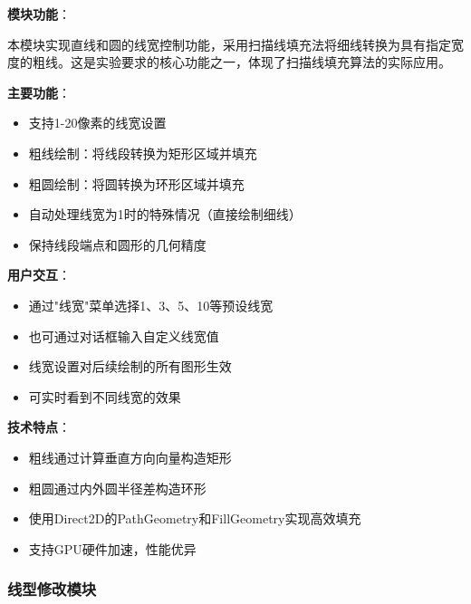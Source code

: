 \documentclass[12pt,a4paper]{article}
\begin{document}
\begin{tcolorbox}
\textbf{模块功能}：

本模块实现直线和圆的线宽控制功能，采用扫描线填充法将细线转换为具有指定宽度的粗线。这是实验要求的核心功能之一，体现了扫描线填充算法的实际应用。

\textbf{主要功能}：
\begin{itemize}
    \item 支持1-20像素的线宽设置
    \item 粗线绘制：将线段转换为矩形区域并填充
    \item 粗圆绘制：将圆转换为环形区域并填充
    \item 自动处理线宽为1时的特殊情况（直接绘制细线）
    \item 保持线段端点和圆形的几何精度
\end{itemize}

\textbf{用户交互}：
\begin{itemize}
    \item 通过"线宽"菜单选择1、3、5、10等预设线宽
    \item 也可通过对话框输入自定义线宽值
    \item 线宽设置对后续绘制的所有图形生效
    \item 可实时看到不同线宽的效果
\end{itemize}

\textbf{技术特点}：
\begin{itemize}
    \item 粗线通过计算垂直方向向量构造矩形
    \item 粗圆通过内外圆半径差构造环形
    \item 使用Direct2D的PathGeometry和FillGeometry实现高效填充
    \item 支持GPU硬件加速，性能优异
\end{itemize}
\end{tcolorbox}

\subsubsection{线型修改模块}
\end{document}
